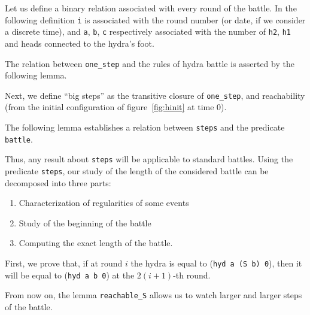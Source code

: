 Let us define a binary relation associated with every round of the battle.
In the following definition \texttt{i} is associated with the round number (or date, if we consider a discrete time), and \texttt{a}, \texttt{b}, \texttt{c} respectively associated with the number of \texttt{h2}, \texttt{h1} and heads connected to the hydra's foot.



The relation between \texttt{one\_step} and the rules of hydra battle is asserted by the following lemma. 

\label{lemma:step-battle}



\vspace{4pt}

Next, we define ``big steps'' as the transitive closure of \texttt{one\_step},
and reachability (from the initial configuration of figure~\ref{fig:hinit} at time $0$).






The following lemma establishes a relation between \texttt{steps} and the predicate \texttt{battle}.



\vspace{4pt}

Thus, any result about \texttt{steps} will be applicable to standard battles.
Using the predicate \texttt{steps},  our study of the length of the considered battle
can  be decomposed into three parts:

\begin{enumerate}
\item  Characterization of regularities of some events
\item Study of the beginning of the battle
\item Computing the exact length of the battle.
\end{enumerate}

First, we prove that, if at round $i$ the hydra is equal to
(\texttt{hyd a (S b) 0}), then it will be equal to (\texttt{hyd a b 0}) at the $2(i+1)$-th round.

\vspace{4pt}




From now on, the lemma \texttt{reachable\_S} allows us to watch larger and larger steps of 
the battle.



